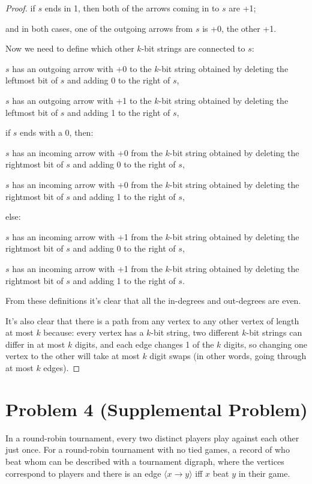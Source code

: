 \documentclass[14pt]{extarticle}
\begin{document}
\begin{proof}
if $s$ ends in 1, then both of the arrows coming in to $s$ are +1;

and in both cases, one of the outgoing arrows from $s$ is +0, the other +1.

Now we need to define which other $k$-bit strings are connected to $s$:

$s$ has an outgoing arrow with +0 to the $k$-bit string obtained by deleting the leftmost bit of $s$ and adding 0 to the right of $s$,

$s$ has an outgoing arrow with +1 to the $k$-bit string obtained by deleting the leftmost bit of $s$ and adding 1 to the right of $s$,

if $s$ ends with a 0, then:

$s$ has an incoming arrow with +0 from the $k$-bit string obtained by deleting the rightmost bit of $s$ and adding 0 to the right of $s$,

$s$ has an incoming arrow with +0 from the $k$-bit string obtained by deleting the rightmost bit of $s$ and adding 1 to the right of $s$,

else:

$s$ has an incoming arrow with +1 from the $k$-bit string obtained by deleting the rightmost bit of $s$ and adding 0 to the right of $s$,

$s$ has an incoming arrow with +1 from the $k$-bit string obtained by deleting the rightmost bit of $s$ and adding 1 to the right of $s$.

From these definitions it's clear that all the in-degrees and out-degrees are even.

It's also clear that there is a path from any vertex to any other vertex of length at most $k$ because: every vertex has a $k$-bit string, two different $k$-bit strings can differ in at most $k$ digits, and each edge changes 1 of the $k$ digits, so changing one vertex to the other will take at most $k$ digit swaps (in other words, going through at most $k$ edges).
\end{proof}

\section{Problem 4 (Supplemental Problem)}
In a round-robin tournament, every two distinct players play against each other just once. For a round-robin tournament with no tied games, a record of who beat whom can be described with a tournament digraph, where the vertices correspond to players and there is an edge $\langle x \to y\rangle$ iff $x$ beat $y$ in their game.
\end{document}
